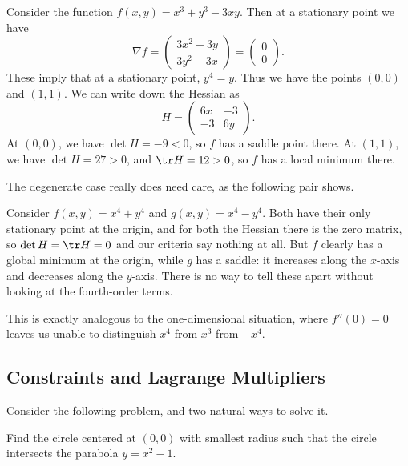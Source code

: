 \begin{example}
	Consider the function $f(x, y) = x^3 + y^3 - 3xy$. Then at a stationary point we have
	$$
\nabla f = \begin{pmatrix}
	3x^2 - 3y \\
	3y^2 - 3x
\end{pmatrix} = \begin{pmatrix}
	0 \\ 0
\end{pmatrix}.
	$$
	These imply that at a stationary point, $y^4 = y$. Thus we have the points $(0, 0)$ and $(1, 1)$. We can write down the Hessian as
	$$
	H = \begin{pmatrix}
		6x & -3 \\ -3 & 6y
	\end{pmatrix}.
	$$
	At $(0, 0)$, we have $\det H = -9 < 0$, so $f$ has a saddle point there. At $(1, 1)$, we have $\det H = 27 > 0$, and $\tr H = 12 > 0$, so $f$ has a local minimum there.
\end{example}

The degenerate case really does need care, as the following pair shows.

\begin{example}
	Consider $f(x, y) = x^4 + y^4$ and $g(x, y) = x^4 - y^4$. Both have their only stationary point at the origin, and for both the Hessian there is the zero matrix, so $\det H = \tr H = 0$ and our criteria say nothing at all. But $f$ clearly has a global minimum at the origin, while $g$ has a saddle: it increases along the $x$-axis and decreases along the $y$-axis. There is no way to tell these apart without looking at the fourth-order terms.

	This is exactly analogous to the one-dimensional situation, where $f''(0) = 0$ leaves us unable to distinguish $x^4$ from $x^3$ from $-x^4$.
\end{example}

\subsection{Constraints and Lagrange Multipliers}\label{sec:lm}

Consider the following problem, and two natural ways to solve it.

\begin{example}
	Find the circle centered at $(0, 0)$ with smallest radius such that the circle intersects the parabola $y = x^2 - 1$.
\end{example}

